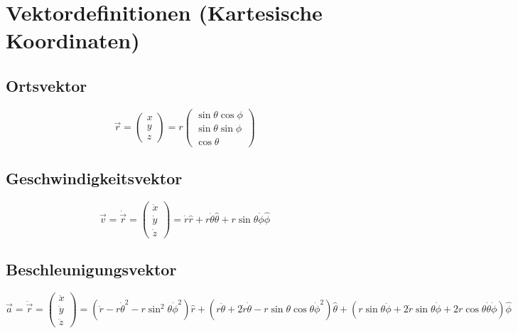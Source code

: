\section{Vektordefinitionen (Kartesische Koordinaten)}
\subsection{Ortsvektor}
\[
\vec{r} = \begin{pmatrix} x \\ y \\ z \end{pmatrix} = r \begin{pmatrix} \sin\theta\cos\phi \\ \sin\theta\sin\phi \\ \cos\theta \end{pmatrix}
\]

\subsection{Geschwindigkeitsvektor}
\[
\vec{v} = \dot{\vec{r}} = \begin{pmatrix} \dot{x} \\ \dot{y} \\ \dot{z} \end{pmatrix} = \dot{r}\hat{r} + r\dot{\theta}\hat{\theta} + r\sin\theta\dot{\phi}\hat{\phi}
\]

\subsection{Beschleunigungsvektor}
\[
\vec{a} = \ddot{\vec{r}} = \begin{pmatrix} \ddot{x} \\ \ddot{y} \\ \ddot{z} \end{pmatrix} = 
\left(\ddot{r} - r\dot{\theta}^2 - r\sin^2\theta\dot{\phi}^2\right)\hat{r} + 
\left(r\ddot{\theta} + 2\dot{r}\dot{\theta} - r\sin\theta\cos\theta\dot{\phi}^2\right)\hat{\theta} + 
\left(r\sin\theta\ddot{\phi} + 2\dot{r}\sin\theta\dot{\phi} + 2r\cos\theta\dot{\theta}\dot{\phi}\right)\hat{\phi}
\]